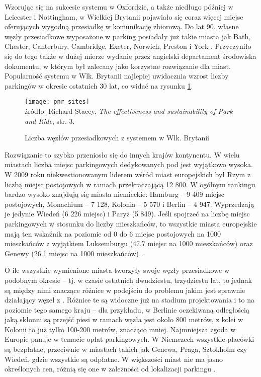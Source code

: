 \documentclass[twoside,12pt]{article}
\begin{document}
	Wzorując się na sukcesie systemu w Oxfordzie, a także niedługo później w Leicester i Nottingham, w Wielkiej Brytanii pojawiało się coraz więcej miejsc oferujących wygodną przesiadkę w komunikację zbiorową. Do lat 90. własne węzły przesiadkowe wyposażone w parking posiadały już takie miasta jak Bath, Chester, Canterbury, Cambridge, Exeter, Norwich, Preston i York \cite{rps}. Przyczyniło się do tego także w dużej mierze wydanie przez angielski departament środowiska dokumentu, w którym \pnr{} był zalecany jako korzystne rozwiązanie dla miast. Popularność systemu w Wlk. Brytanii najlepiej uwidacznia wzrost liczby parkingów w okresie ostatnich 30 lat, co widać na rysunku \ref{pnr_sites}.
	
	\begin{figure}[H]
		\centering
		\caption{Liczba węzłów przesiadkowych z systemem \pnr{} w Wlk. Brytanii}
		\texttt{[image: pnr\_sites]}\\
		\footnotesize{źródło: Richard Stacey. \emph{The effectiveness and sustainability of Park and Ride}, str. 3. \cite{rps}}
		\label{pnr_sites}
	\end{figure}
	
	Rozwiązanie to szybko przeniosło się do innych krajów kontynentu. W wielu miastach liczba miejsc parkingowych dedykowanych pod \pnr{} jest wyjątkowo wysoka. W 2009 roku niekwestionowanym liderem wśród miast europejskich był Rzym z liczbą miejsc postojowych w ramach \pnr{} przekraczającą 12 800. W ogólnym rankingu bardzo wysoko znajdują się miasta niemieckie: Hamburg -- 9 409 miejsc postojowych, Monachium -- 7 128, Kolonia -- 5 570 i Berlin -- 4 947. Wyprzedzają je jedynie Wiedeń (6 226 miejsc) i Paryż (5 849). Jeśli spojrzeć na liczbę miejsc parkingowych w stosunku do liczby mieszkańców, to wszystkie miasta europejskie mają ten wskaźnik na poziomie od 0 do 6 miejsc postojowych na 1000 mieszkańców z wyjątkiem Luksemburgu (47.7 miejsc na 1000 mieszkańców) oraz Genewy (26.1 miejsc na 1000 mieszkańców) \cite{eurotest}.
	
	O ile wszystkie wymienione miasta tworzyły swoje węzły przesiadkowe w podobnym okresie -- tj. w czasie ostatnich dwudziestu, trzydziestu lat, to jednak są między nimi znaczące różnice w podejściu do problemu jakim jest sprawnie działający węzeł z \pnr{}. Różnice te są widoczne już na stadium projektowania i to na poziomie tego samego kraju -- dla przykładu, w Berlinie oczekiwaną odległością jaką skłonni są przejść piesi w ramach węzła jest około 800 metrów, z kolei w Kolonii to już tylko 100-200 metrów, znacząco mniej. Najmniejsza zgoda w Europie panuje w temacie opłat parkingowych. W Niemczech wszystkie placówki \pnr{} są bezpłatne, przeciwnie w miastach takich jak Genewa, Praga, Sztokholm czy Wiedeń, gdzie wszystkie są odpłatne. W większości miast nie ma jasno określonych cen, różnią się one w zależności od lokalizacji parkingu \cite{eurotest}.
	
\end{document}
